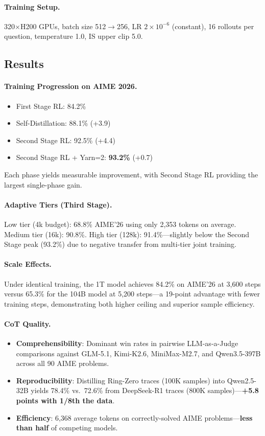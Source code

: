 \documentclass[11pt,a4paper]{article}
\begin{document}
\paragraph{Training Setup.} 320$\times$H200 GPUs, batch size 512$\to$256, LR $2 \times 10^{-6}$ (constant), 16 rollouts per question, temperature 1.0, IS upper clip 5.0.

\subsection{Results}

\paragraph{Training Progression on AIME 2026.}
\begin{itemize}
\item First Stage RL: 84.2\%
\item Self-Distillation: 88.1\% (+3.9)
\item Second Stage RL: 92.5\% (+4.4)
\item Second Stage RL + Yarn=2: \textbf{93.2\%} (+0.7)
\end{itemize}
Each phase yields measurable improvement, with Second Stage RL providing the largest single-phase gain.

\paragraph{Adaptive Tiers (Third Stage).} Low tier (4k budget): 68.8\% AIME'26 using only 2,353 tokens on average. Medium tier (16k): 90.8\%. High tier (128k): 91.4\%---slightly below the Second Stage peak (93.2\%) due to negative transfer from multi-tier joint training.

\paragraph{Scale Effects.} Under identical training, the 1T model achieves 84.2\% on AIME'26 at 3,600 steps versus 65.3\% for the 104B model at 5,200 steps---a 19-point advantage with fewer training steps, demonstrating both higher ceiling and superior sample efficiency.

\paragraph{CoT Quality.}
\begin{itemize}
\item \textbf{Comprehensibility}: Dominant win rates in pairwise LLM-as-a-Judge comparisons against GLM-5.1, Kimi-K2.6, MiniMax-M2.7, and Qwen3.5-397B across all 90 AIME problems.
\item \textbf{Reproducibility}: Distilling Ring-Zero traces (100K samples) into Qwen2.5-32B yields 78.4\% vs.\ 72.6\% from DeepSeek-R1 traces (800K samples)---\textbf{+5.8 points with 1/8th the data}.
\item \textbf{Efficiency}: 6,368 average tokens on correctly-solved AIME problems---\textbf{less than half} of competing models.
\end{itemize}
\end{document}
